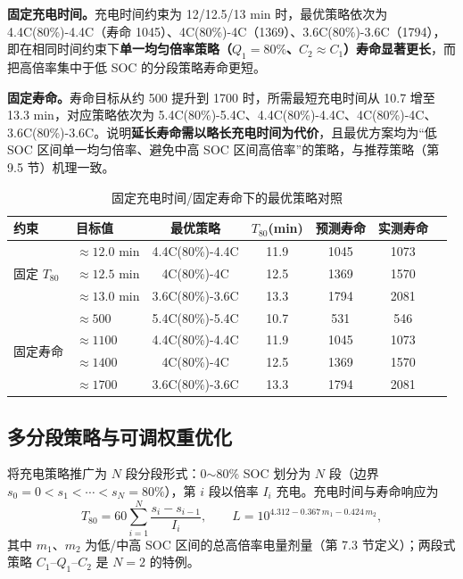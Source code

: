 \documentclass[withoutpreface]{cumcmthesis}
\begin{document}
\textbf{固定充电时间。}充电时间约束为 12/12.5/13 min 时，最优策略依次为 4.4C(80\%)-4.4C（寿命 1045）、4C(80\%)-4C（1369）、3.6C(80\%)-3.6C（1794），即在相同时间约束下\textbf{单一均匀倍率策略（$Q_1=80\%$、$C_2\approx C_1$）寿命显著更长}，而把高倍率集中于低 SOC 的分段策略寿命更短。

\textbf{固定寿命。}寿命目标从约 500 提升到 1700 时，所需最短充电时间从 10.7 增至 13.3 min，对应策略依次为 5.4C(80\%)-5.4C、4.4C(80\%)-4.4C、4C(80\%)-4C、3.6C(80\%)-3.6C。说明\textbf{延长寿命需以略长充电时间为代价}，且最优方案均为“低 SOC 区间单一均匀倍率、避免中高 SOC 区间高倍率”的策略，与推荐策略（第 9.5 节）机理一致。

\begin{table}[htbp]
\centering
\caption{固定充电时间/固定寿命下的最优策略对照}
\label{tab:iso}
\begin{tabular}{llccccc}
\toprule
约束 & 目标值 & 最优策略 & $T_{80}$(min) & 预测寿命 & 实测寿命 \\
\midrule
\multirow{3}{*}{固定 $T_{80}$} & $\approx 12.0$ min & 4.4C(80\%)-4.4C & 11.9 & 1045 & 1073 \\
 & $\approx 12.5$ min & 4C(80\%)-4C & 12.5 & 1369 & 1570 \\
 & $\approx 13.0$ min & 3.6C(80\%)-3.6C & 13.3 & 1794 & 2081 \\
\midrule
\multirow{4}{*}{固定寿命} & $\approx 500$ & 5.4C(80\%)-5.4C & 10.7 & 531 & 546 \\
 & $\approx 1100$ & 4.4C(80\%)-4.4C & 11.9 & 1045 & 1073 \\
 & $\approx 1400$ & 4C(80\%)-4C & 12.5 & 1369 & 1570 \\
 & $\approx 1700$ & 3.6C(80\%)-3.6C & 13.3 & 1794 & 2081 \\
\bottomrule
\end{tabular}
\end{table}

\subsection{多分段策略与可调权重优化}

将充电策略推广为 $N$ 段分段形式：0$\sim$80\% SOC 划分为 $N$ 段（边界 $s_0=0<s_1<\cdots<s_N=80\%$），第 $i$ 段以倍率 $I_i$ 充电。充电时间与寿命响应为
\begin{equation}\label{eq:multi}
T_{80}=60\sum_{i=1}^{N}\frac{s_i-s_{i-1}}{I_i},\qquad
\hat{L}=10^{4.312-0.367\,m_1-0.424\,m_2},
\end{equation}
其中 $m_1$、$m_2$ 为低/中高 SOC 区间的总高倍率电量剂量（第 7.3 节定义）；两段式策略 $C_1$--$Q_1$--$C_2$ 是 $N=2$ 的特例。
\end{document}
